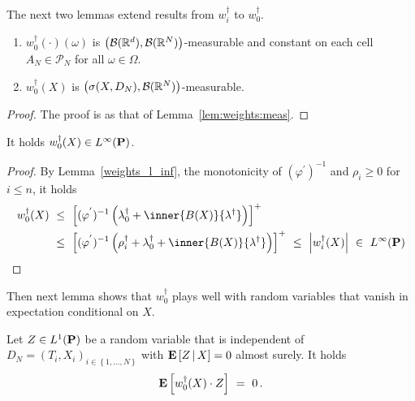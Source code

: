 The next two lemmas extend results from $w^\dagger_i$ to $w^\dagger_0$.
\begin{lemma}
  \label{lem:meas_w_0}
  \quad
  \begin{enumerate}[label=(\roman*)]
\item
  $w_0^\dagger(\cdot)(\omega)$ is 
  $\left(
    \mathcal{B}(\R^d),\mathcal{B}(\R^N)
  \right)$-measurable
  and
  constant on each cell 
  $A_N\in\mathcal{P}_N$
  for all $\omega\in\Omega$. 
\item
  $w_0^\dagger(X)$ is $\left(
    \sigma(X,D_N),\mathcal{B}(\R^N)
  \right)$-measurable. 
  \end{enumerate}
\end{lemma}
\begin{proof}
The proof is as that of Lemma~\ref{lem:weights:meas}.
\end{proof}
\begin{lemma}
  \label{weights_0_l_inf}
  It holds $w_0^\dagger(X)\in L^\infty(\P)$.
\end{lemma}
\begin{proof}
  By Lemma~\ref{weights_l_inf},
  the monotonicity of 
  $
  (\varphi^{'})^{-1}
  $
  and $\rho_i\ge 0$ for $i\le n$,
  it holds
  \begin{align*}
    w_0^\dagger(X) 
    &
    \ 
    \le
    \ 
  \left[ 
  (\varphi^{'})^{-1}
  \left( 
    \lambda_0^\dagger
    +
    \inner
    {B(X)}
    {\lambda^\dagger}
  \right)
\right]^+
\\
&
\ 
\le
\ 
  \left[ 
  (\varphi^{'})^{-1}
  \left( 
    \rho_i^\dagger
    +
    \lambda_0^\dagger
    +
    \inner
    {B(X)}
    {\lambda^\dagger}
  \right)
\right]^+
\ 
\le
\ 
\left| 
    w_i^\dagger(X) 
\right|
\ 
\in
\ 
L^\infty(\P)
  \end{align*}
\end{proof}
Then next lemma shows that $w^\dagger_0$ plays well with random variables that vanish in expectation conditional on $X$.
\begin{lemma}
  \label{w.Z=0}
 Let 
 $Z\in L^1(\P)$
  be a random variable that is independent of $D_N=(T_i,X_i)_{i\in \left\{
    1,\ldots,N
  \right\}}$ 
  with
  $
\E
\left[
  Z
  \,
  |
  \, 
  X
\right]
= 0
  $
  almost surely.
  It holds
  \begin{gather*}
  \E
  \left[
    w_0^\dagger(X)
  \cdot Z
  \right]
  \ 
  =
  \ 
  0
  \,.
  \end{gather*}
\end{lemma}
